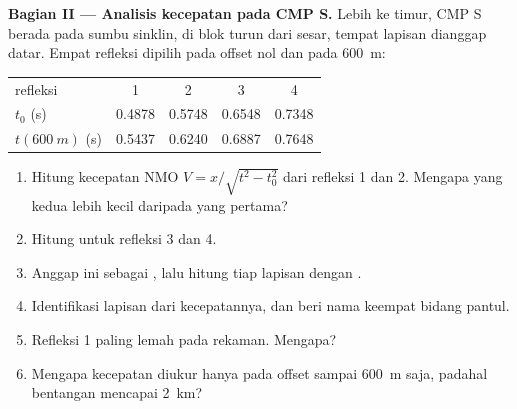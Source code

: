 \begin{problem}
\noindent\textbf{Bagian II --- Analisis kecepatan pada CMP S.} Lebih ke timur, CMP S
berada pada sumbu sinklin, di blok turun dari sesar, tempat
lapisan dianggap datar. Empat refleksi dipilih pada offset nol dan pada
\qty{600}{m}:
\begin{center}
\small
\begin{tabular}{lcccc}
\hline
refleksi & 1 & 2 & 3 & 4 \\
$t_0$ (\unit{s}) & 0.4878 & 0.5748 & 0.6548 & 0.7348 \\
$t(\qty{600}{m})$ (\unit{s}) & 0.5437 & 0.6240 & 0.6887 & 0.7648 \\
\hline
\end{tabular}
\end{center}
\begin{enumerate}[resume]
  \item Hitung kecepatan NMO $V = x/\sqrt{t^2 - t_0^2}$ dari refleksi 1
        dan 2. Mengapa yang kedua lebih kecil daripada yang pertama?
  \item Hitung untuk refleksi 3 dan 4.
  \item Anggap ini sebagai , lalu hitung  tiap
        lapisan dengan .
  \item Identifikasi lapisan dari kecepatannya, dan beri nama keempat
        bidang pantul.
  \item Refleksi 1 paling lemah pada rekaman. Mengapa?
  \item Mengapa kecepatan diukur hanya pada offset sampai \qty{600}{m}
        saja, padahal bentangan mencapai \qty{2}{km}?
\end{enumerate}


\end{problem}
